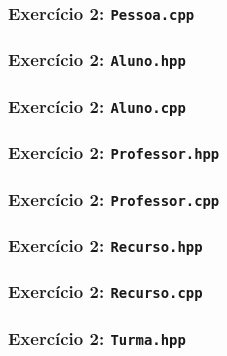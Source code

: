 \documentclass[aspectratio=169]{beamer}
\begin{document}
\begin{frame}[fragile]\frametitle{Exercício 2: \texttt{Pessoa.cpp}}

\end{frame}

\begin{frame}[fragile]\frametitle{Exercício 2: \texttt{Aluno.hpp}}

\end{frame}

\begin{frame}[fragile]\frametitle{Exercício 2: \texttt{Aluno.cpp}}
\fontsize{6pt}{6pt}\selectfont{

}
\end{frame}

\begin{frame}[fragile]\frametitle{Exercício 2: \texttt{Professor.hpp}}

\end{frame}

\begin{frame}[fragile]\frametitle{Exercício 2: \texttt{Professor.cpp}}
\fontsize{5pt}{5pt}\selectfont{

}
\end{frame}

\begin{frame}[fragile]\frametitle{Exercício 2: \texttt{Recurso.hpp}}

\end{frame}

\begin{frame}[fragile]\frametitle{Exercício 2: \texttt{Recurso.cpp}}
\fontsize{6pt}{6pt}\selectfont{

}
\end{frame}

\begin{frame}[fragile]\frametitle{Exercício 2: \texttt{Turma.hpp}}
\fontsize{5pt}{5pt}\selectfont{

}
\end{frame}
\end{document}
